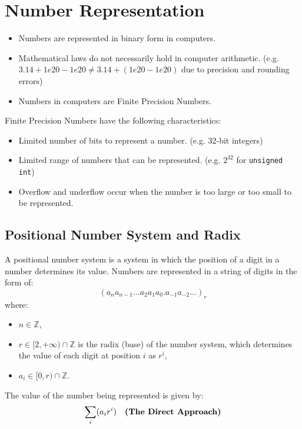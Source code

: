 \section{Number Representation}

\begin{itemize}
    \item Numbers are represented in binary form in computers.
    \item Mathematical laws do not necessarily hold in computer arithmetic.
          (e.g. $3.14 + 1e20 - 1e20 \neq 3.14 + (1e20 - 1e20)$ due to precision and rounding errors)
    \item Numbers in computers are Finite Precision Numbers.
\end{itemize}

\begin{definition}\label{def:finite-precision-numbers}
    Finite Precision Numbers have the following characteristics:
    \begin{itemize}
        \item Limited number of bits to represent a number. (e.g. 32-bit integers)
        \item Limited range of numbers that can be represented. (e.g. $2^{32}$ for \texttt{unsigned int})
        \item Overflow and underflow occur when the number is too large or too small to be represented.
    \end{itemize}
\end{definition}

\subsection{Positional Number System and Radix}

\begin{definition}\label{def:positional-number-system}
    A positional number system is a system in which the position of a digit in a number determines
    its value. Numbers are represented in a string of digits in the form of:
    \begin{equation*}
        (a_na_{n-1}\ldots a_2a_1a_0.a_{-1}a_{-2}\ldots)_r
    \end{equation*}
    where:
    \begin{itemize}
        \item $n\in\mathbb{Z}$,
        \item $r\in[2, +\infty)\cap\mathbb{Z}$ is the radix (base) of the number system,
              which determines the value of each digit at position $i$ as $r^i$,
        \item $a_i\in[0, r)\cap\mathbb{Z}$.
    \end{itemize}

    The value of the number being represented is given by:
    \begin{equation}\label{eq:positional-number-system-value-direct}
        \sum_{i} (a_i r^i) \quad\text{\bfseries (The Direct Approach)}
    \end{equation}
\end{definition}

